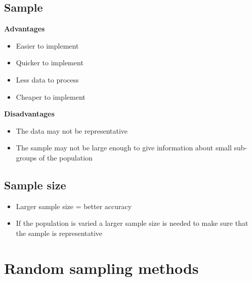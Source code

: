 \documentclass[oneside,fleqn,11pt]{book}
\begin{document}
	\subsection{Sample}
	\textbf{Advantages}
	\begin{itemize}
		\item Easier to implement
		\item Quicker to implement
		\item Less data to process
		\item Cheaper to implement
	\end{itemize}
	\textbf{Disadvantages}
	\begin{itemize}
		\item The data may not be representative
		\item The sample may not be large enough to give information about small sub-groups of the population
	\end{itemize}
	\subsection{Sample size}
	\begin{itemize}
		\item Larger sample size = better accuracy
		\item If the population is varied a larger sample size is needed to make sure that the sample is representative
	\end{itemize}
	
	
	\section{Random sampling methods}
\end{document}
